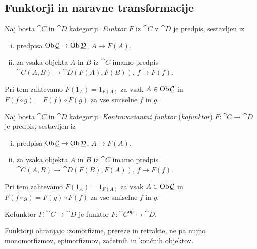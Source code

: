 \newpage

\subsection{Funktorji in naravne transformacije}


\begin{definicija}
Naj bosta $\cat{C}$ in $\cat{D}$ kategoriji.
\emph{Funktor} $F$ iz $\cat{C}$ v $\cat{D}$ je
predpis, sestavljen iz

\begin{enumerate}[i)]
\item predpisa $\operatorname{Ob} \underline{\mathcal{C}} \to \operatorname{Ob} \underline{\mathcal{D}}$, $A \mapsto F(A)$,
\item za vsaka objekta $A$ in $B$ iz $\cat{C}$ imamo predpis
$\cat{C}(A,B) \to \cat{D}(F(A), F(B))$, $f \mapsto F(f)$.
\end{enumerate}

Pri tem zahtevamo $F(1_A) = 1_{F(A)}$ za vsak $A \in \operatorname{Ob} \underline{\mathcal{C}}$
in $F(f \circ g) = F(f) \circ F(g)$ za vse smiselne $f$ in $g$.
\end{definicija}

\begin{definicija}
Naj bosta $\cat{C}$ in $\cat{D}$ kategoriji.
\emph{Kontravariantni funktor}
(\emph{kofunktor}) $F \colon \cat{C} \to \cat{D}$ je predpis,
sestavljen iz

\begin{enumerate}[i)]
\item predpisa $\operatorname{Ob} \underline{\mathcal{C}} \to \operatorname{Ob} \underline{\mathcal{D}}$, $A \mapsto F(A)$,
\item za vsaka objekta $A$ in $B$ iz $\cat{C}$ imamo predpis
$\cat{C}(A,B) \to \cat{D}(F(B), F(A))$, $f \mapsto F(f)$.
\end{enumerate}

Pri tem zahtevamo $F(1_A) = 1_{F(A)}$ za vsak $A \in \operatorname{Ob} \underline{\mathcal{C}}$
in $F(f \circ g) = F(g) \circ F(f)$ za vse smiselne $f$ in $g$.
\end{definicija}

\begin{opomba}
Kofunktor $F \colon \cat{C} \to \cat{D}$ je funktor
$F \colon \cat{C}^{\mathsf{op}} \to \cat{D}$.
\end{opomba}

\begin{opomba}
Funktorji ohranjajo izomorfizme, prereze in retrakte, ne pa nujno
monomorfizmov, epimorfizmov, začetnih in končnih objektov.
\end{opomba}

